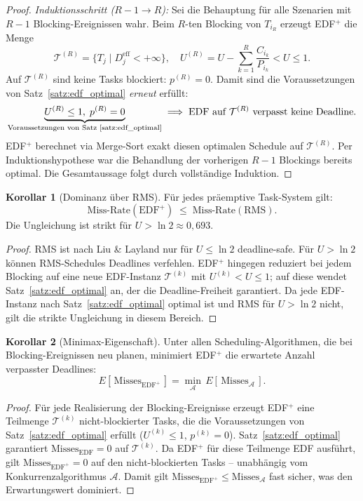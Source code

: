 ﻿\documentclass[a4paper,12pt]{article}
\theoremstyle{definition}
\newtheorem{korollar}{Korollar}
\begin{document}
\begin{proof}
		\emph{Induktionsschritt ($R-1 \to R$):}
		Sei die Behauptung für alle Szenarien mit $R-1$
		Blocking-Ereignissen wahr. Beim $R$-ten Blocking von $T_{i_R}$
		erzeugt EDF$^+$ die Menge
		\[
		\mathcal{T}^{(R)} = \bigl\{T_j \mid D_j^{\text{eff}} < +\infty\bigr\},
		\quad U^{(R)} = U - \sum_{k=1}^{R} \frac{C_{i_k}}{P_{i_k}} < U \le 1.
		\]
		Auf $\mathcal{T}^{(R)}$ sind keine Tasks blockiert: $p^{(R)} = 0$.
		Damit sind die Voraussetzungen von Satz~\ref{satz:edf_optimal}
		\emph{erneut} erfüllt:
		\[
		\underbrace{U^{(R)} \le 1,\; p^{(R)} = 0}_{%
		\text{Voraussetzungen von Satz~\ref{satz:edf_optimal}}}
		\;\Longrightarrow\;
		\text{EDF auf } \mathcal{T}^{(R)} \text{ verpasst keine Deadline.}
		\]
		EDF$^+$ berechnet via Merge-Sort exakt diesen optimalen Schedule auf
		$\mathcal{T}^{(R)}$. Per Induktionshypothese war die Behandlung der
		vorherigen $R-1$ Blockings bereits optimal. Die Gesamtaussage folgt
		durch vollständige Induktion.
	\end{proof}

	\begin{korollar}[Dominanz über RMS]
		\label{kor:rms}
		Für jedes präemptive Task-System gilt:
		\[
		\text{Miss-Rate}(\text{EDF}^+) \;\le\; \text{Miss-Rate}(\text{RMS}).
		\]
		Die Ungleichung ist strikt für $U > \ln 2 \approx 0{,}693$.
	\end{korollar}

	\begin{proof}
		RMS ist nach Liu \& Layland \cite{Liu1973} nur für $U \le \ln 2$ deadline-safe.
		Für $U > \ln 2$ können RMS-Schedules Deadlines verfehlen. EDF$^+$ hingegen
		reduziert bei jedem Blocking auf eine neue EDF-Instanz
		$\mathcal{T}^{(k)}$ mit $U^{(k)} < U \le 1$; auf diese wendet
		Satz~\ref{satz:edf_optimal} an, der die Deadline-Freiheit garantiert.
		Da jede EDF-Instanz nach Satz~\ref{satz:edf_optimal} optimal ist und
		RMS für $U > \ln 2$ nicht, gilt die strikte Ungleichung in diesem
		Bereich.
	\end{proof}

	\begin{korollar}[Minimax-Eigenschaft]
		Unter allen Scheduling-Algorithmen, die bei Blocking-Ereignissen neu planen,
		minimiert EDF$^+$ die erwartete Anzahl verpasster Deadlines:
		\[
		E[\,\text{Misses}_{\text{EDF}^+}\,] = \min_{\mathcal{A}} \,E[\,\text{Misses}_{\mathcal{A}}\,].
		\]
	\end{korollar}

	\begin{proof}
		Für jede Realisierung der Blocking-Ereignisse erzeugt EDF$^+$ eine
		Teilmenge $\mathcal{T}^{(k)}$ nicht-blockierter Tasks, die die Voraussetzungen
		von Satz~\ref{satz:edf_optimal} erfüllt ($U^{(k)} \le 1$, $p^{(k)} = 0$).
		Satz~\ref{satz:edf_optimal} garantiert $\text{Misses}_{\text{EDF}} = 0$ auf
		$\mathcal{T}^{(k)}$. Da EDF$^+$ für diese Teilmenge EDF ausführt, gilt
		$\text{Misses}_{\text{EDF}^+} = 0$ auf den nicht-blockierten Tasks
		-- unabhängig vom Konkurrenzalgorithmus $\mathcal{A}$.
		Damit gilt $\text{Misses}_{\text{EDF}^+} \le \text{Misses}_{\mathcal{A}}$
		fast sicher, was den Erwartungswert dominiert.
	\end{proof}
\end{document}

